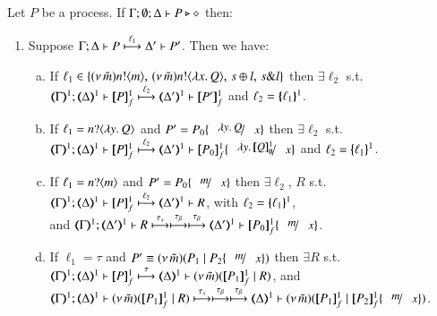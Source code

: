 \begin{proposition}\rm
	\label{app:prop:op_corr_HOp_to_HO}
	Let $P$ be a \HOp process.
	If $\Gamma; \emptyset; \Delta \vdash P \triangleright \diamond$ then:
%
	\begin{enumerate}[1.]
		\item
			Suppose $\Gamma; \Delta \vdash P \stackrel{\ell_1}{\longmapsto} \Delta' \vdash P'$. Then we have:
%
			\begin{enumerate}[a)]
				\item
					If $\ell_1 \in \{(\nu\, \tilde{m})n ! \langle m \rangle, \,(\nu\, \tilde{m})n ! \langle \lambda x.\,Q \rangle, \,s \oplus l, \,s \& l\}$
					then $\exists \ell_2$ s.t. \\
					$\horel{\tmap{\Gamma}{1}}{\tmap{\Delta}{1}}{\pmapp{P}{1}{f}}{\hby{\ell_2}}{\tmap{\Delta'}{1}}{\pmapp{P'}{1}{f}}$
					and $\ell_2 = \{\!\!\{\ell_1\}\!\!\}^{1}$.
			
				\item
					If $\ell_1 = n ? \langle \lambda y.\,Q \rangle$ and
					$P' = P_0 \subst{\abs{y}Q}{x}$
					then $\exists \ell_2$ s.t. \\
					$\horel{\tmap{\Gamma}{1}}{\tmap{\Delta}{1}}{\pmapp{P}{1}{f}}{\hby{\ell_2}}{\tmap{\Delta'}{1}}{\pmapp{P_0}{1}{f}\subst{\abs{y}\pmapp{Q}{1}{\emptyset}}{x}}$
					and $\ell_2 = \{\!\!\{\ell_1\}\!\!\}^{1}$.
			
				\item
					If $\ell_1 = n ? \langle m \rangle$
					and 
					$P' = P_0 \subst{m}{x}$
					then $\exists \ell_2$, $R$ s.t. \\
					$\horel{\tmap{\Gamma}{1}}{\tmap{\Delta}{1}}{\pmapp{P}{1}{f}}{\hby{\ell_2}}{\tmap{\Delta'}{1}}{R}$,
					with $\ell_2 = \{\!\!\{\ell_1\}\!\!\}^{1}$, \\
					and
					$\horel{\tmap{\Gamma}{1}}{\tmap{\Delta'}{1}}{R}{\hby{\stau} \hby{\btau} \hby{\btau}}
					{\tmap{\Delta'}{1}}{\pmapp{P_0}{1}{f}\subst{m}{x}}$.
						
				\item
					If $\ell_1 = \tau$
					and $P' \scong \newsp{\tilde{m}}{P_1 \Par P_2\subst{m}{x}}$
					then $\exists R$ s.t. \\
					$\horel{\tmap{\Gamma}{1}}{\tmap{\Delta}{1}}{\pmapp{P}{1}{f}}{\hby{\tau}}{\mapt{\Delta}^{1}}{\newsp{\tilde{m}}{\pmapp{P_1}{1}{f} \Par R}}$,
					and\\ 
					$\horel{\tmap{\Gamma}{1}}{\tmap{\Delta}{1}}{\newsp{\tilde{m}}{\pmapp{P_1}{1}{f} \Par R}}{\hby{\stau} \hby{\btau} \hby{\btau}}
					{\mapt{\Delta}^{1}}{\newsp{\tilde{m}}{\pmapp{P_1}{1}{f} \Par \pmapp{P_2}{1}{f}\subst{m}{x}}}$.
			

\end{enumerate}
\end{enumerate}
\end{proposition}
